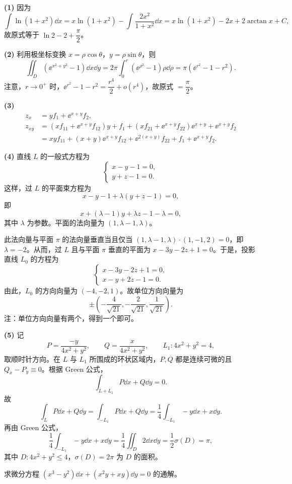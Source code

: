 \begin{solution}
\textbf{(1)} 因为
\[ \int \ln(1+x^2)\dd x=x\ln(1+x^2)-\int\frac{2x^2}{1+x^2}\dd x=x\ln(1+x^2)-2x+2\arctan x+C, \]
故原式等于 $\ln 2-2+\dfrac{\pi}{2}$。

\textbf{(2)} 利用极坐标变换 $x=\rho\cos\theta$，$y=\rho\sin\theta$，则
\[ \iint_D (\ee^{x^2+y^2}-1)\dd x\dd y=2\pi\int_0^r(\ee^{\rho^2}-1)\rho\dd\rho=\pi(\ee^{r^2}-1-r^2). \]
注意，$r\to0^+$ 时，$\ee^{r^2}-1-r^2=\dfrac{r^4}{2}+o(r^4)$，故原式 $=\dfrac{\pi}{2}$。

\textbf{(3)}
\begin{align*}
z_x &= yf_1+\ee^{x+y}f_2,\\
z_{xy} &= (xf_{11}+\ee^{x+y}f_{12})y+f_1+(xf_{21}+\ee^{x+y}f_{22})\ee^{x+y}+\ee^{x+y}f_2\\
&= xyf_{11}+(x+y)\ee^{x+y}f_{12}+\ee^{2(x+y)}f_{22}+f_1+\ee^{x+y}f_2.
\end{align*}

\textbf{(4)} 直线 $L$ 的一般式方程为
\[ \begin{cases} x-y-1=0,\\ y+z-1=0. \end{cases} \]
这样，过 $L$ 的平面束方程为
\[ x-y-1+\lambda(y+z-1)=0, \]
即
\[ x+(\lambda-1)y+\lambda z-1-\lambda=0, \]
其中 $\lambda$ 为参数。平面的法向量为 $(1,\lambda-1,\lambda)$。

此法向量与平面 $\pi$ 的法向量垂直当且仅当 $(1,\lambda-1,\lambda)\cdot(1,-1,2)=0$，即 $\lambda=-2$。从而，过 $L$ 且与平面 $\pi$ 垂直的平面为 $x-3y-2z+1=0$。于是，投影直线 $L_0$ 的方程为
\[ \begin{cases} x-3y-2z+1=0,\\ x-y+2z-1=0. \end{cases} \]
由此，$L_0$ 的方向向量为 $(-4,-2,1)$。故单位方向向量为
\[ \pm\left(-\frac{4}{\sqrt{21}},-\frac{2}{\sqrt{21}},\frac{1}{\sqrt{21}}\right). \]
注：单位方向向量有两个，得到一个即可。

\textbf{(5)} 记
\[ P=\frac{-y}{4x^2+y^2},\qquad Q=\frac{x}{4x^2+y^2},\qquad L_1: 4x^2+y^2=4, \]
取顺时针方向。在 $L$ 与 $L_1$ 所围成的环状区域内，$P,Q$ 都是连续可微的且 $Q_x-P_y\equiv0$。根据 Green 公式，
\[ \int_{L+L_1}P\dd x+Q\dd y=0. \]
故
\[ \int_L P\dd x+Q\dd y=\int_{-L_1}P\dd x+Q\dd y=\frac{1}{4}\int_{-L_1}-y\dd x+x\dd y. \]
再由 Green 公式，
\[ \frac{1}{4}\int_{-L_1}-y\dd x+x\dd y=\frac{1}{4}\iint_D 2\dd x\dd y=\frac{1}{2}\sigma(D)=\pi, \]
其中 $D: 4x^2+y^2\le4$，$\sigma(D)=2\pi$ 为 $D$ 的面积。
\end{solution}

求微分方程 $(x^3-y^2)\dd x+(x^2y+xy)\dd y=0$ 的通解。

